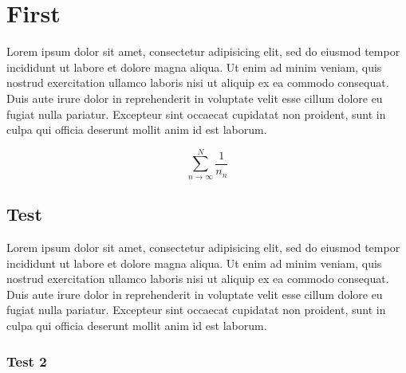 \documentclass[a4paper]{article}
\title{\mytitle}
\author{
{\myauthor} \\
\textit{\small \myaffiliation} \\
\small{\texttt{\href{\myemail}{\myemail}}}
}
\date{\today} %
\begin{document}
\maketitle

\begin{abstract}
Lorem ipsum dolor sit amet, consectetur adipisicing elit, sed do eiusmod tempor incididunt ut labore
et dolore magna aliqua. Ut enimad minim veniam, quis nostrud exercitation ullamco laboris
nisi ut aliquip ex ea commodo consequat. Duis aute irure dolor in reprehenderit in voluptate velit
esse cillum dolore eu fugiat nulla pariatur. Excepteur sint occaecat cupidatat non proident, sunt
in culpa qui ocia deserunt mollit anim id est laborum.
\end{abstract}



\section{First}
Lorem ipsum dolor sit amet, consectetur adipisicing elit, sed do eiusmod
tempor incididunt ut labore et dolore magna aliqua. Ut enim ad minim veniam,
quis nostrud exercitation ullamco laboris nisi ut aliquip ex ea commodo
consequat. Duis aute irure dolor in reprehenderit in voluptate velit esse
cillum dolore eu fugiat nulla pariatur. Excepteur sint occaecat cupidatat non
proident, sunt in culpa qui officia deserunt mollit anim id est laborum.
 \begin{theorem}
 \end{theorem}
\[
	\sum_{n \rightarrow \infty}^N \frac{1}{n_n}
\]

\subsection{Test} %
\label{sub:test}
Lorem ipsum dolor sit amet, consectetur adipisicing elit, sed do eiusmod
tempor incididunt ut labore et dolore magna aliqua. Ut enim ad minim veniam,
quis nostrud exercitation ullamco laboris nisi ut aliquip ex ea commodo
consequat. Duis aute irure dolor in reprehenderit in voluptate velit esse
cillum dolore eu fugiat nulla pariatur. Excepteur sint occaecat cupidatat non
proident, sunt in culpa qui officia deserunt mollit anim id est laborum.
 \begin{definition}
 \end{definition}
\subsubsection{Test 2} %
\label{ssub:test_2}
\end{document}
